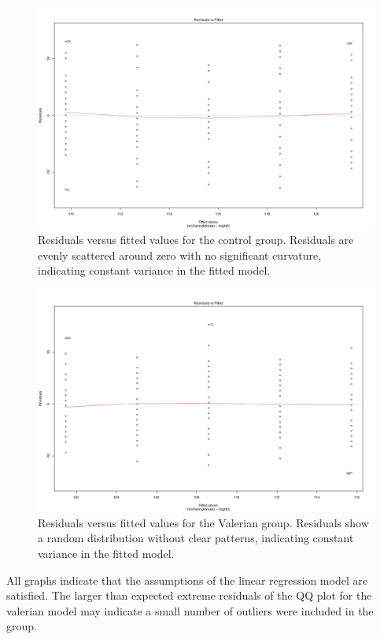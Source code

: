 \documentclass[10pt,preprintnumbers,amsmath,amssymb,floatfix,twocolumn,prl]{revtex4-2}
\begin{document}
\begin{figure}[H]
\centering
\includegraphics[width=0.95\linewidth]{residual_fitted_control.png}
\caption{Residuals versus fitted values for the control group. Residuals are evenly scattered around zero with no significant curvature, indicating constant variance in the fitted model.}
\end{figure}

\begin{figure}[H]
\centering
\includegraphics[width=0.95\linewidth]{residual_fitted_valerian.png}
\caption{Residuals versus fitted values for the Valerian group. Residuals show a random distribution without clear patterns, indicating constant variance in the fitted model.}
\end{figure}

All graphs indicate that the assumptions of the linear regression model are satisfied. The larger than expected extreme residuals of the QQ plot for the valerian model may indicate a small number of outliers were included in the group.\\
\end{document}

